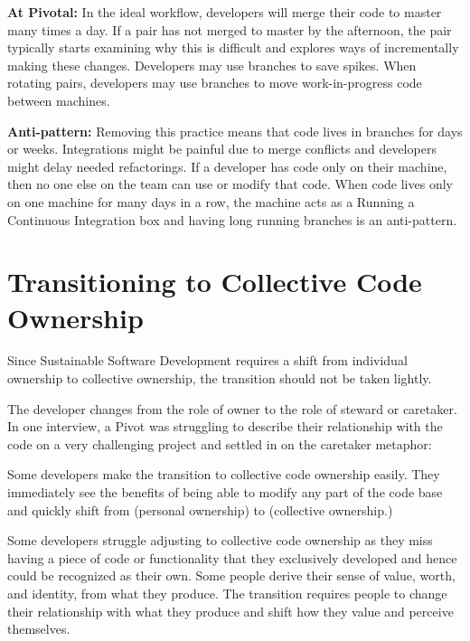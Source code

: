 \begin{table}[]
\textbf{At Pivotal:} In the ideal workflow, developers will merge their code to master many times a day. If a pair has not merged to master by the afternoon, the pair typically starts examining why this is difficult and explores ways of incrementally making these changes. Developers may use branches to save spikes. When rotating pairs, developers may use branches to move work-in-progress code between machines.  

\textbf{Anti-pattern:} Removing this practice means that code lives in branches for days or weeks. Integrations might be painful due to merge conflicts and developers might delay needed refactorings. If a developer has code only on their machine, then no one else on the team can use or modify that code. When code lives only on one machine for many days in a row, the machine acts as a  Running a Continuous Integration box and having long running branches is an anti-pattern.
\section{Transitioning to Collective Code Ownership}
\label{Transitioning}
Since Sustainable Software Development requires a shift from individual ownership to collective ownership, the transition should not be taken lightly. 

The developer changes from the role of owner to the role of steward or caretaker. In one interview, a Pivot was struggling to describe their relationship with the code on a very challenging project and settled in on the caretaker metaphor: 

Some developers make the transition to collective code ownership easily. They immediately see the benefits of being able to modify any part of the code base and quickly shift from  (personal ownership) to  (collective ownership.)

Some developers struggle adjusting to collective code ownership as they miss having a piece of code or functionality that they exclusively developed and hence could be recognized as their own. Some people derive their sense of value, worth, and identity, from what they produce. The transition requires people to change their relationship with what they produce and shift how they value and perceive themselves. 


\end{table}
